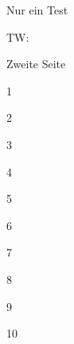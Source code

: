 
\renewcommand{\bbwAufgabenBlockID}{A1G}

\renewcommand{\metaHeaderLine}{Aufgabenblatt}
\renewcommand{\arbeitsblattTitel}{Grundoperationen}



Nur ein Test

TW:
\the\textwidth


\mmPapierBisEndeSeite

\newpage

Zweite Seite

1

2

3

4

5

6

7

8

9

10

\mmPapierBisEndeSeite
\newpage

